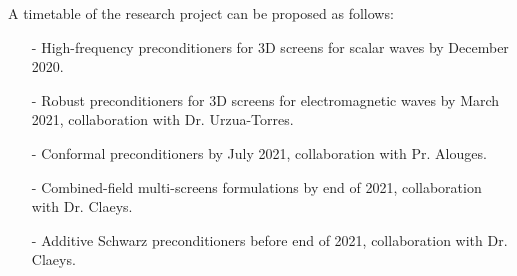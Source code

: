 \documentclass[]{report}
\begin{document}
A timetable of the research project can be proposed as follows:
\begin{itemize}\itemsep-0.2em 
	\item[-] High-frequency preconditioners for 3D screens for scalar waves by December 2020.
	\item[-] Robust preconditioners for 3D screens for electromagnetic waves by March 2021, collaboration with Dr. Urzua-Torres.
	\item[-] Conformal preconditioners by July 2021, collaboration with Pr. Alouges. 
	\item[-] Combined-field multi-screens formulations by end of 2021, collaboration with Dr. Claeys. 
	\item[-] Additive Schwarz preconditioners before end of 2021, collaboration with Dr. Claeys.
\end{itemize}
\end{document}
